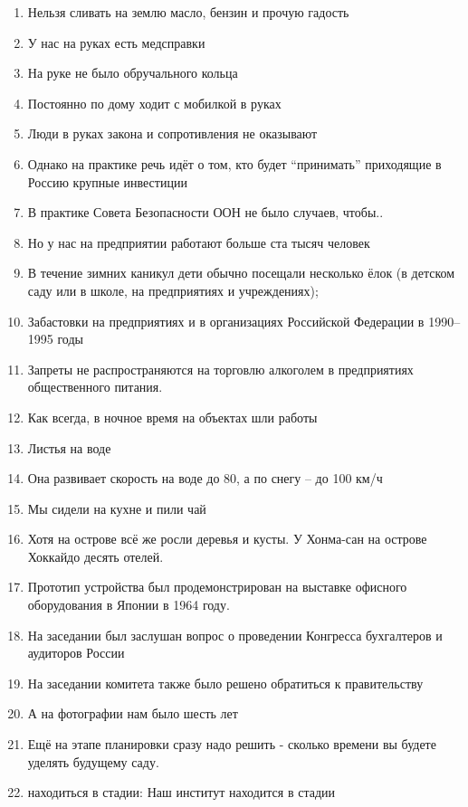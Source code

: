 \documentclass[]{scrreprt}
\providecommand{\tightlist}{%
  \setlength{\itemsep}{0pt}\setlength{\parskip}{0pt}}
\begin{document}
\begin{enumerate}
\def\labelenumi{(\arabic{enumi})}
\setcounter{enumi}{160}
\tightlist
\item
  Нельзя сливать на землю масло, бензин и прочую гадость
\item
  У нас на руках есть медсправки
\item
  На руке не было обручального кольца
\item
  Постоянно по дому ходит с мобилкой в руках
\item
  Люди в руках закона и сопротивления не оказывают
\item
  Однако на практике речь идёт о том, кто будет ``принимать'' приходящие
  в Россию крупные инвестиции
\item
  В практике Совета Безопасности ООН не было случаев, чтобы..
\item
  Но у нас на предприятии работают больше ста тысяч человек
\item
  В течение зимних каникул дети обычно посещали несколько ёлок (в
  детском саду или в школе, на предприятиях и учреждениях);
\item
  Забастовки на предприятиях и в организациях Российской Федерации в
  1990-- 1995 годы
\item
  Запреты не распространяются на торговлю алкоголем в предприятиях
  общественного питания.
\item
  Как всегда, в ночное время на объектах шли работы
\item
  Листья на воде
\item
  Она развивает скорость на воде до 80, а по снегу -- до 100 км/ч
\item
  Мы сидели на кухне и пили чай
\item
  Хотя на острове всё же росли деревья и кусты. У Хонма-сан на острове
  Хоккайдо десять отелей.
\item
  Прототип устройства был продемонстрирован на выставке офисного
  оборудования в Японии в 1964 году.
\item
  На заседании был заслушан вопрос о проведении Конгресса бухгалтеров и
  аудиторов России
\item
  На заседании комитета также было решено обратиться к правительству
\item
  А на фотографии нам было шесть лет
\item
  Ещё на этапе планировки сразу надо решить - сколько времени вы будете
  уделять будущему саду.
\item
  находиться в стадии: Наш институт находится в стадии

\end{enumerate}
\end{document}
